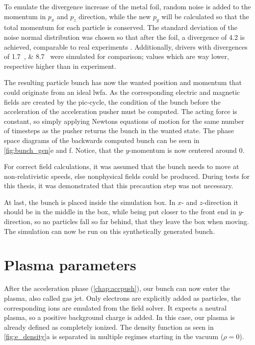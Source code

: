 \documentclass[bachelor_thesis]{subfiles}
\begin{document}
To emulate the divergence increase of the metal foil, random noise is added to the momentum in $p_x$ and $p_z$ direction, while the new $p_y$ will be calculated so that the total momentum for each particle is conserved.
The standard deviation of the noise normal distribution was chosen so that after the foil, a divergence of \qty{4.2}{\mrad} is achieved, comparable to real experiments \cite{Schoebel2022}.
Additionally, drivers with divergences of \qtylist{1.7; 8.7}{\mrad} were simulated for comparison; values which are way lower, respective higher than in experiment.

The resulting particle bunch has now the wanted position and momentum that could originate from an ideal \gls{lwfa}. As the corresponding electric and magnetic fields are created by the \gls{pic}-cycle,
the condition of the bunch before the acceleration of the acceleration pusher must be computed. The acting force is constant, so simply applying Newtons equations of motion for the same number of timesteps as the pusher returns the bunch in the wanted state.
The phase space diagrams of the backwards computed bunch can be seen in \autoref {fig:bunch_gen}e and f. Notice, that the $y$-momentum is now centered around \num{0}.

For correct field calculations, it was assumed that the bunch needs to move at non-relativistic speeds, else nonphysical fields could be produced. During tests for this thesis, it was demonstrated that this precaution step was not necessary.

At last, the bunch is placed inside the simulation box. In $x$- and $z$-direction it should be in the middle in the box, while being put closer to the front end in $y$-direction, so no particles fall so far behind, that they leave the box when moving.
The simulation can now be run on this synthetically generated bunch.

\section{Plasma parameters}\label{chap:plasma}
After the acceleration phase (\autoref{chap:accpush}), our bunch can now enter the plasma, also called gas jet.
Only electrons are explicitly added as particles, the corresponding ions are emulated from the field solver. It expects a neutral plasma, so a positive background charge is added. 
In this case, our plasma is already defined as completely ionized. The density function as seen in \autoref{fig:e_density}a is separated in multiple regimes starting in the vacuum ($\rho=0$). 
\end{document}
